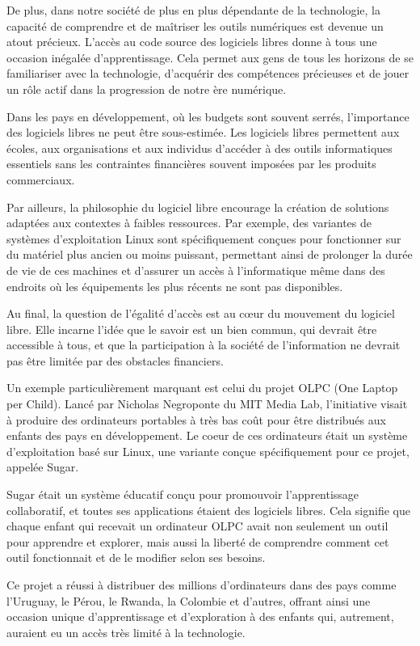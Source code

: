 De plus, dans notre société de plus en plus dépendante de la technologie, la capacité de comprendre et de maîtriser les outils numériques est devenue un atout précieux. L'accès au code source des logiciels libres donne à tous une occasion inégalée d'apprentissage. Cela permet aux gens de tous les horizons de se familiariser avec la technologie, d'acquérir des compétences précieuses et de jouer un rôle actif dans la progression de notre ère numérique.

Dans les pays en développement, où les budgets sont souvent serrés, l'importance des logiciels libres ne peut être sous-estimée. Les logiciels libres permettent aux écoles, aux organisations et aux individus d'accéder à des outils informatiques essentiels sans les contraintes financières souvent imposées par les produits commerciaux.

Par ailleurs, la philosophie du logiciel libre encourage la création de solutions adaptées aux contextes à faibles ressources. Par exemple, des variantes de systèmes d'exploitation Linux sont spécifiquement conçues pour fonctionner sur du matériel plus ancien ou moins puissant, permettant ainsi de prolonger la durée de vie de ces machines et d'assurer un accès à l'informatique même dans des endroits où les équipements les plus récents ne sont pas disponibles.

Au final, la question de l'égalité d'accès est au cœur du mouvement du logiciel libre. Elle incarne l'idée que le savoir est un bien commun, qui devrait être accessible à tous, et que la participation à la société de l'information ne devrait pas être limitée par des obstacles financiers.

Un exemple particulièrement marquant est celui du projet OLPC (One Laptop per Child). Lancé par Nicholas Negroponte du MIT Media Lab, l'initiative visait à produire des ordinateurs portables à très bas coût pour être distribués aux enfants des pays en développement. Le coeur de ces ordinateurs était un système d'exploitation basé sur Linux, une variante conçue spécifiquement pour ce projet, appelée Sugar.

Sugar était un système éducatif conçu pour promouvoir l'apprentissage collaboratif, et toutes ses applications étaient des logiciels libres. Cela signifie que chaque enfant qui recevait un ordinateur OLPC avait non seulement un outil pour apprendre et explorer, mais aussi la liberté de comprendre comment cet outil fonctionnait et de le modifier selon ses besoins.

Ce projet a réussi à distribuer des millions d'ordinateurs dans des pays comme l'Uruguay, le Pérou, le Rwanda, la Colombie et d'autres, offrant ainsi une occasion unique d'apprentissage et d'exploration à des enfants qui, autrement, auraient eu un accès très limité à la technologie.

